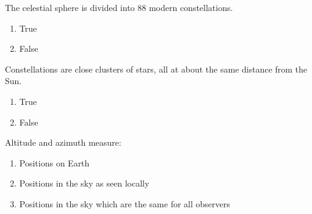 \documentclass[11pt]{article}
\begin{document}
\begin{enumerate}
\begin{minipage}{\textwidth}
\begin{minipage}{\textwidth}
\item The celestial sphere is divided into 88 modern constellations.
\begin{multicols}{3}
\begin{enumerate} 
\setlength{\itemsep}{1pt} 
\setlength{\parskip}{0pt} 
\setlength{\parsep}{0pt}
\setlength{\multicolsep}{1pt} 
\item True
\item False
\end{enumerate} 
\vfill 
\end{multicols}

\end{minipage}
\end{minipage}
\vskip 0.20in

\begin{minipage}{\textwidth}
\begin{minipage}{\textwidth}
\item Constellations are close clusters of stars, all at about the same distance from the Sun.
\begin{multicols}{3}
\begin{enumerate} 
\setlength{\itemsep}{1pt} 
\setlength{\parskip}{0pt} 
\setlength{\parsep}{0pt}
\setlength{\multicolsep}{1pt} 
\item True
\item False
\end{enumerate} 
\vfill 
\end{multicols}

\end{minipage}
\end{minipage}
\vskip 0.20in

\begin{minipage}{\textwidth}
\begin{minipage}{\textwidth}
\item Altitude and azimuth measure:
\begin{enumerate} 
\setlength{\itemsep}{1pt} 
\setlength{\parskip}{0pt} 
\setlength{\parsep}{0pt}
\setlength{\multicolsep}{1pt} 
\item Positions on Earth
\item Positions in the sky as seen locally
\item Positions in the sky which are the same for all observers
\end{enumerate} 
\end{minipage}
\end{minipage}
\vskip 0.20in


\end{enumerate}
\end{document}
